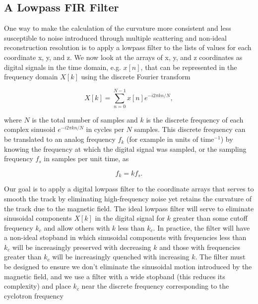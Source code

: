 \documentclass{JINST}
\begin{document}
\subsection{A Lowpass FIR Filter}\label{ssec:FIR}
One way to make the calculation of the curvature more consistent and less susceptible to noise introduced through 
multiple scattering and non-ideal reconstruction resolution is to apply a lowpass filter to the lists of values for each 
coordinate x, y, and z.  We now look at the arrays of x, y, and z coordinates as digital signals in the time
domain, e.g. $x[n]$, that can be represented in the frequency domain $X[k]$ using the discrete Fourier transform

\begin{equation}
X[k] = \sum_{n=0}^{N-1}x[n]e^{-i2\pi kn/N},
\end{equation}

\noindent where $N$ is the total number of samples and $k$ is the discrete frequency of each complex
sinusoid $e^{-i2\pi kn/N}$ in cycles per $N$ samples.  This discrete frequency can be translated to an analog
frequency $f_{k}$ (for example in units of time$^{-1}$) by knowing the frequency at which the digital signal was
sampled, or the sampling frequency $f_{s}$ in samples per unit time, as

\begin{equation}
f_{k} = kf_{s}.
\end{equation}

Our goal is to apply a digital lowpass filter to the coordinate arrays that serves to
smooth the track by eliminating high-frequency noise yet retains the curvature of the track
due to the magnetic field.  The ideal lowpass filter will serve to eliminate sinusoidal components
$X[k]$ in the digital signal for $k$ greater than some cutoff frequency $k_{c}$ and allow 
others with $k$ less than $k_{c}$.  In practice, the filter will have a non-ideal stopband in which sinusoidal 
components with frequencies less than $k_{c}$ will be increasingly preserved with decreasing $k$ and those 
with frequencies greater than $k_{c}$ will be increasingly quenched with increasing $k$.  The filter must be designed 
to ensure we don't eliminate the sinusoidal motion introduced by the magnetic field, and we use a
filter with a wide stopband (this reduces its complexity) and place $k_{c}$ near the discrete frequency corresponding
to the cyclotron frequency

\end{document}

